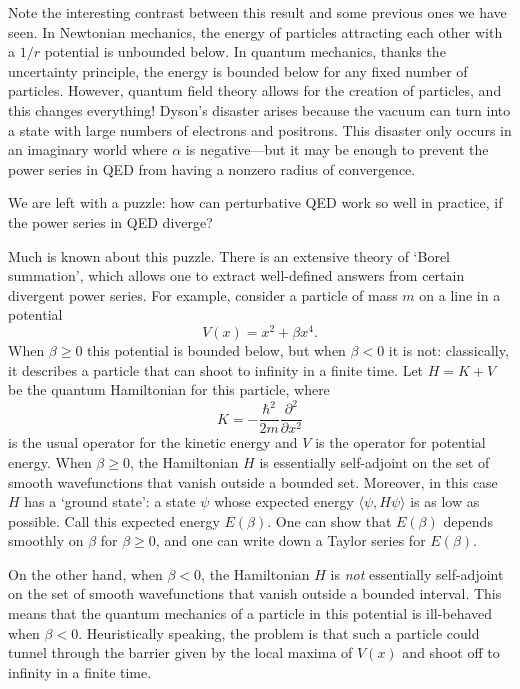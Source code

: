 \documentclass[12pt]{article}
\begin{document}
Note the interesting contrast between this result and some previous ones we have seen.  In Newtonian mechanics, the energy of particles attracting each other with a $1/r$ potential is unbounded below.   In quantum mechanics, thanks the uncertainty principle, the energy is bounded below for any fixed number of particles.  However, quantum field theory allows for the creation of particles, and this changes everything!   Dyson's disaster arises because the vacuum can turn into a state with large numbers of electrons and positrons.  This disaster only occurs in an imaginary world where $\alpha$ is negative---but it may be enough to prevent the power series in QED from having a nonzero radius of convergence.  

We are left with a puzzle: how can perturbative QED work so well in practice, if the power series in QED diverge?

Much is known about this puzzle.   There is an extensive theory of `Borel summation', which allows one to extract well-defined answers from certain divergent power series. For example, consider a particle of mass $m$ on a line in a potential
\[    V(x) = x^2 + \beta x^4  .\]
When $\beta \ge 0$ this potential is bounded below, but when $\beta < 0$ it is not: classically, it describes a particle that can shoot to infinity in a finite time.   Let $H = K + V$ be the quantum Hamiltonian for this particle, where
\[  K = -\displaystyle{\frac{\hbar^2}{2m} \frac{\partial^2}{\partial x^2} } \]
is the usual operator for the kinetic energy and $V$ is the operator for potential energy.  When $\beta \ge 0$, the Hamiltonian $H$ is essentially self-adjoint on the set of smooth wavefunctions that vanish outside a bounded set.  Moreover, in this case $H$ has a `ground state': a state $\psi$ whose expected energy $\langle \psi, H \psi \rangle$ is as low as possible.   Call this expected energy $E(\beta)$.  One can show that $E(\beta)$ depends smoothly on $\beta$ for $\beta \ge 0$, and one can write down a Taylor series for $E(\beta)$.  

On the other hand, when $\beta < 0$, the Hamiltonian $H$ is \emph{not} essentially self-adjoint on the set of smooth wavefunctions that vanish outside a bounded interval.  This means that the quantum mechanics of a particle in this potential is ill-behaved when $\beta < 0$.  Heuristically speaking, the problem is that such a particle could tunnel through the barrier given by the local maxima of $V(x)$ and shoot off to infinity in a finite time.
\end{document}
